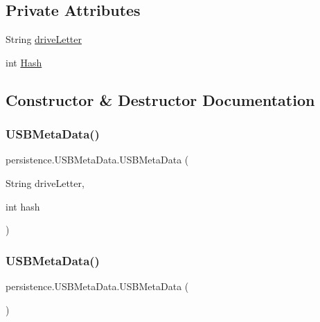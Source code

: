\subsection*{Private Attributes}
\begin{DoxyCompactItemize}
\item 
String \mbox{\hyperlink{classpersistence_1_1_u_s_b_meta_data_a4a566816eb5a831dda4b8c153891480f}{drive\+Letter}}
\item 
int \mbox{\hyperlink{classpersistence_1_1_u_s_b_meta_data_a85de1aae267979cebb86acacc2ea2d4e}{Hash}}
\end{DoxyCompactItemize}


\subsection{Constructor \& Destructor Documentation}
\mbox{\label{classpersistence_1_1_u_s_b_meta_data_afc6faf24dc686ad216f678947528bc21}} 
\subsubsection{\texorpdfstring{U\+S\+B\+Meta\+Data()}{USBMetaData()}\hspace{0.1cm}{\footnotesize\ttfamily [1/2]}}
{\footnotesize\ttfamily persistence.\+U\+S\+B\+Meta\+Data.\+U\+S\+B\+Meta\+Data (\begin{DoxyParamCaption}\item[{String}]{drive\+Letter,  }\item[{int}]{hash }\end{DoxyParamCaption})}

\mbox{\label{classpersistence_1_1_u_s_b_meta_data_a6d71c1d72066d41fe7fc2c7d26cde11d}} 
\subsubsection{\texorpdfstring{U\+S\+B\+Meta\+Data()}{USBMetaData()}\hspace{0.1cm}{\footnotesize\ttfamily [2/2]}}
{\footnotesize\ttfamily persistence.\+U\+S\+B\+Meta\+Data.\+U\+S\+B\+Meta\+Data (\begin{DoxyParamCaption}{ }\end{DoxyParamCaption})}



